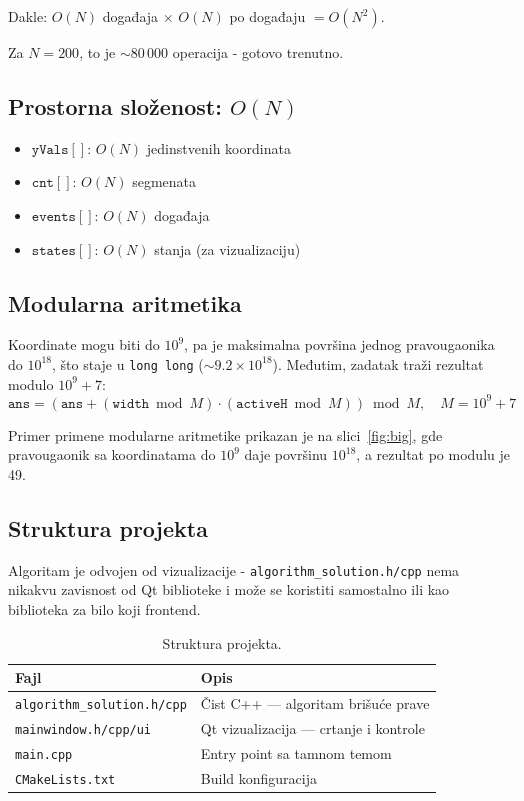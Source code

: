 \documentclass{article}
\begin{document}
Dakle: $O(N)$ događaja $\times$ $O(N)$ po događaju $= O(N^2)$.

Za $N = 200$, to je $\sim 80\,000$ operacija - gotovo trenutno.

\subsection{Prostorna složenost: $O(N)$}

\begin{itemize}[nosep]
    \item $\texttt{yVals}[]$: $O(N)$ jedinstvenih koordinata
    \item $\texttt{cnt}[]$: $O(N)$ segmenata
    \item $\texttt{events}[]$: $O(N)$ događaja
    \item $\texttt{states}[]$: $O(N)$ stanja (za vizualizaciju)
\end{itemize}

\subsection{Modularna aritmetika}

Koordinate mogu biti do $10^9$, pa je maksimalna površina jednog pravougaonika do $10^{18}$, što staje u \texttt{long long} ($\sim 9.2 \times 10^{18}$). Međutim, zadatak traži rezultat modulo $10^9 + 7$:
\[
\texttt{ans} = \left(\texttt{ans} + (\texttt{width} \bmod M) \cdot (\texttt{activeH} \bmod M)\right) \bmod M, \quad M = 10^9 + 7
\]

Primer primene modularne aritmetike prikazan je na slici~\ref{fig:big}, gde pravougaonik sa koordinatama do $10^9$ daje površinu $10^{18}$, a rezultat po modulu je 49.

\subsection{Struktura projekta}

Algoritam je odvojen od vizualizacije - \texttt{algorithm\_solution.h/cpp} nema nikakvu zavisnost od Qt biblioteke i može se koristiti samostalno ili kao biblioteka za bilo koji frontend.

\begin{table}[H]
\centering
\begin{tabular}{ll}
\toprule
Fajl & Opis \\
\midrule
\texttt{algorithm\_solution.h/cpp} & Čist C++ --- algoritam brišuće prave \\
\texttt{mainwindow.h/cpp/ui} & Qt vizualizacija --- crtanje i kontrole \\
\texttt{main.cpp} & Entry point sa tamnom temom \\
\texttt{CMakeLists.txt} & Build konfiguracija \\
\bottomrule
\end{tabular}
\caption{Struktura projekta.}
\label{tab:structure}
\end{table}
\end{document}
